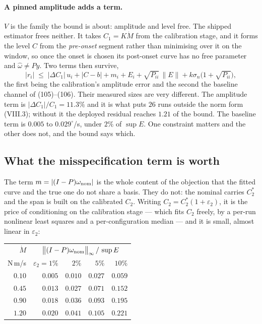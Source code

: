 \documentclass[10pt]{article}
\newcommand{\Mdot}{\dot M}
\begin{document}
\paragraph{A pinned amplitude adds a term.} $V$ is the family the bound
is about: amplitude and level free. The shipped estimator frees neither.
It takes $C_1 = K\Mdot$ from the calibration stage, and it forms the
level $C$ from the \emph{pre-onset} segment rather than minimising over
it on the window, so once the onset is chosen its post-onset curve has
no free parameter and $\hat\omega\ne Py$. Two terms then survive,
\begin{equation*}
  |r_i| \;\le\; |\Delta C_1|\,u_i + |C-b|
        + m_i + E_i + \sqrt{P_{ii}}\,\|E\|
        + k\sigma_n\bigl(1+\sqrt{P_{ii}}\bigr),
\end{equation*}
the first being the calibration's amplitude error and the second the
baseline channel of (105)--(106). Their measured sizes are very
different. The amplitude term is $|\Delta C_1|/C_1 = 11.3\%$ and it is
what puts $26$ runs outside the norm form (VIII.3); without it the
deployed residual reaches $1.21$ of the bound. The baseline term is
$0.005$ to $0.029^\circ$/s, under $2\%$ of $\sup E$. One constraint
matters and the other does not, and the bound says which.

\subsection{What the misspecification term is worth}
\label{sec:c2}

The term $m = |(I-P)\omega_{\rm nom}|$ is the whole content of the
objection that the fitted curve and the true one do not share a basis.
They do not: the nominal carries $C_2^{*}$ and the span is built on the
calibrated $C_2$. Writing $C_2 = C_2^{*}(1+\varepsilon_2)$, it is the
price of conditioning on the calibration stage --- which fits $C_2$
freely, by a per-run nonlinear least squares and a per-configuration
median --- and it is small, almost linear in $\varepsilon_2$:

\begin{center}\small
\begin{tabular}{@{}rrrrr@{}}
\toprule
$\Mdot$ & \multicolumn{4}{c}{$\bigl\|(I-P)\omega_{\rm nom}\bigr\|_\infty
 \,/\,\sup E$}\\
N\,m/s & $\varepsilon_2 = 1\%$ & $2\%$ & $5\%$ & $10\%$\\
\midrule
$0.10$ & $0.005$ & $0.010$ & $0.027$ & $0.059$\\
$0.45$ & $0.013$ & $0.027$ & $0.071$ & $0.152$\\
$0.90$ & $0.018$ & $0.036$ & $0.093$ & $0.195$\\
$1.20$ & $0.020$ & $0.041$ & $0.105$ & $0.221$\\
\bottomrule
\end{tabular}
\end{center}
\end{document}
